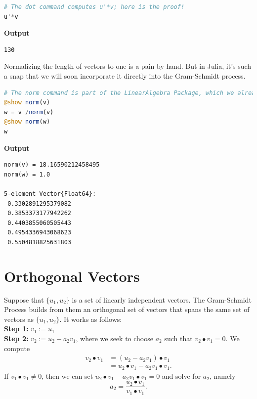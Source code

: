 \begin{lstlisting}[language=Julia,style=mystyle]
# The dot command computes u'*v; here is the proof!
u'*v 
\end{lstlisting}
\textbf{Output} 
\begin{verbatim}
130
\end{verbatim}

Normalizing the length of vectors to one is a pain by hand. But in Julia, it's such a snap that we will soon incorporate it directly into the Gram-Schmidt process. 

\begin{lstlisting}[language=Julia,style=mystyle]
# The norm command is part of the LinearAlgebra Package, which we already ran
@show norm(v)
w = v /norm(v)
@show norm(w)
w 
\end{lstlisting}
\textbf{Output} 
\begin{verbatim}
norm(v) = 18.16590212458495
norm(w) = 1.0

5-element Vector{Float64}:
 0.3302891295379082
 0.3853373177942262
 0.4403855060505443
 0.4954336943068623
 0.5504818825631803
\end{verbatim}

\section{Orthogonal Vectors}

Suppose that $\{ u_1, u_2\}$ is a set of linearly independent vectors. The Gram-Schmidt Process builds from them an orthogonal set of vectors that spans the same set of vectors as $\{ u_1, u_2\}$. It works as follows:\\

\textbf{Step 1:} $v_1 := u_1$ \\

\textbf{Step 2:} $v_2 := u_2  - a_2 v_1$, where we seek to choose $a_2$ such that $v_2 \bullet v_1 = 0$. We compute
\begin{align*}
    v_2 \bullet v_1 &  = \left( u_2  - a_2 v_1 \right) \bullet  v_1 \\
    &= u_2 \bullet v_1 - a_2 v_1 \bullet v_1.
\end{align*}
If $ v_1 \bullet v_1\neq 0$, then we can set $u_2 \bullet v_1 - a_2 v_1 \bullet v_1 = 0$ and solve for $a_2$, namely
$$a_2 = \frac{u_2 \bullet v_1}{v_1 \bullet v_1}. $$
\\


